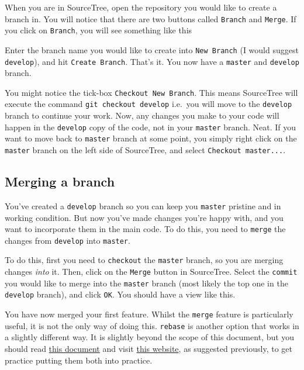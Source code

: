 \documentclass[]{book}
\begin{document}
When you are in SourceTree, open the repository you would like to create a branch in. You will notice that there are two buttons called \texttt{Branch} and \texttt{Merge}. If you click on \texttt{Branch}, you will see something like this

Enter the branch name you would like to create into \texttt{New\ Branch} (I would suggest \texttt{develop}), and hit \texttt{Create\ Branch}. That's it. You now have a \texttt{master} and \texttt{develop} branch.

You might notice the tick-box \texttt{Checkout\ New\ Branch}. This means SourceTree will execute the command \texttt{git\ checkout\ develop} i.e.~you will move to the \texttt{develop} branch to continue your work. Now, any changes you make to your code will happen in the \texttt{develop} copy of the code, not in your \texttt{master} branch. Neat. If you want to move back to \texttt{master} branch at some point, you simply right click on the \texttt{master} branch on the left side of SourceTree, and select \texttt{Checkout\ master...}.

\hypertarget{merging-a-branch}{%
\subsection{Merging a branch}\label{merging-a-branch}}

You've created a \texttt{develop} branch so you can keep you \texttt{master} pristine and in working condition. But now you've made changes you're happy with, and you want to incorporate them in the main code. To do this, you need to \texttt{merge} the changes from \texttt{develop} into \texttt{master}.

To do this, first you need to \texttt{checkout} the \texttt{master} branch, so you are merging changes \emph{into} it. Then, click on the \texttt{Merge} button in SourceTree. Select the \texttt{commit} you would like to merge into the \texttt{master} branch (most likely the top one in the \texttt{develop} branch), and click \texttt{OK}. You should have a view like this.

You have now merged your first feature. Whilst the \texttt{merge} feature is particularly useful, it is not the only way of doing this. \texttt{rebase} is another option that works in a slightly different way. It is slightly beyond the scope of this document, but you should read \href{https://www.atlassian.com/git/tutorials/merging-vs-rebasing}{this document} and visit \href{https://learnGitbranching.js.org/}{this website}, as suggested previously, to get practice putting them both into practice.
\end{document}
